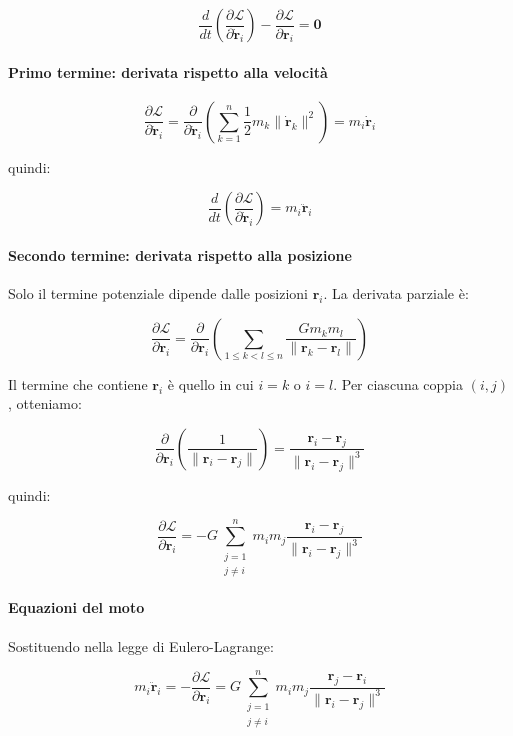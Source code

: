 \documentclass[a4paper,12pt]{article}
\begin{document}
\[
\frac{d}{dt} \left( \frac{\partial \mathcal{L}}{\partial \dot{\mathbf{r}}_i} \right) - \frac{\partial \mathcal{L}}{\partial \mathbf{r}_i} = \mathbf{0}
\]

\paragraph{Primo termine: derivata rispetto alla velocità}

\[
\frac{\partial \mathcal{L}}{\partial \dot{\mathbf{r}}_i} = \frac{\partial}{\partial \dot{\mathbf{r}}_i} \left( \sum_{k=1}^n \frac{1}{2} m_k \|\dot{\mathbf{r}}_k\|^2 \right) = m_i \dot{\mathbf{r}}_i
\]

quindi:

\[
\frac{d}{dt} \left( \frac{\partial \mathcal{L}}{\partial \dot{\mathbf{r}}_i} \right) = m_i \ddot{\mathbf{r}}_i
\]

\paragraph{Secondo termine: derivata rispetto alla posizione}

Solo il termine potenziale dipende dalle posizioni \( \mathbf{r}_i \). La derivata parziale è:

\[
\frac{\partial \mathcal{L}}{\partial \mathbf{r}_i} = \frac{\partial}{\partial \mathbf{r}_i} \left( \sum_{1 \leq k < l \leq n} \frac{G m_k m_l}{\|\mathbf{r}_k - \mathbf{r}_l\|} \right)
\]

Il termine che contiene \( \mathbf{r}_i \) è quello in cui \( i = k \) o \( i = l \). Per ciascuna coppia \( (i, j) \), otteniamo:

\[
\frac{\partial}{\partial \mathbf{r}_i} \left( \frac{1}{\|\mathbf{r}_i - \mathbf{r}_j\|} \right) = \frac{\mathbf{r}_i - \mathbf{r}_j}{\|\mathbf{r}_i - \mathbf{r}_j\|^3}
\]

quindi:

\[
\frac{\partial \mathcal{L}}{\partial \mathbf{r}_i} = -G \sum_{\substack{j=1 \\ j \ne i}}^n m_i m_j \frac{\mathbf{r}_i - \mathbf{r}_j}{\|\mathbf{r}_i - \mathbf{r}_j\|^3}
\]

\paragraph{Equazioni del moto}

Sostituendo nella legge di Eulero-Lagrange:

\[
m_i \ddot{\mathbf{r}}_i = -\frac{\partial \mathcal{L}}{\partial \mathbf{r}_i} = G \sum_{\substack{j=1 \\ j \ne i}}^n m_i m_j \frac{\mathbf{r}_j - \mathbf{r}_i}{\|\mathbf{r}_i - \mathbf{r}_j\|^3}
\]
\end{document}
